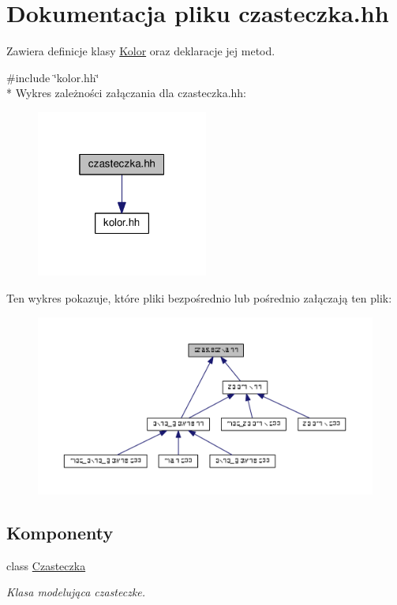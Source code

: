 \hypertarget{czasteczka_8hh}{}\section{Dokumentacja pliku czasteczka.\+hh}
\label{czasteczka_8hh}


Zawiera definicje klasy \hyperlink{class_kolor}{Kolor} oraz deklaracje jej metod.  


{\ttfamily \#include \char`\"{}kolor.\+hh\char`\"{}}\\*
Wykres zależności załączania dla czasteczka.\+hh\+:\nopagebreak
\begin{figure}[H]
\begin{center}
\leavevmode
\includegraphics[width=160pt]{czasteczka_8hh__incl}
\end{center}
\end{figure}
Ten wykres pokazuje, które pliki bezpośrednio lub pośrednio załączają ten plik\+:
\nopagebreak
\begin{figure}[H]
\begin{center}
\leavevmode
\includegraphics[width=350pt]{czasteczka_8hh__dep__incl}
\end{center}
\end{figure}
\subsection*{Komponenty}
\begin{DoxyCompactItemize}
\item 
class \hyperlink{class_czasteczka}{Czasteczka}
\begin{DoxyCompactList}\small\item\em Klasa modelująca czasteczke. \end{DoxyCompactList}\end{DoxyCompactItemize}
